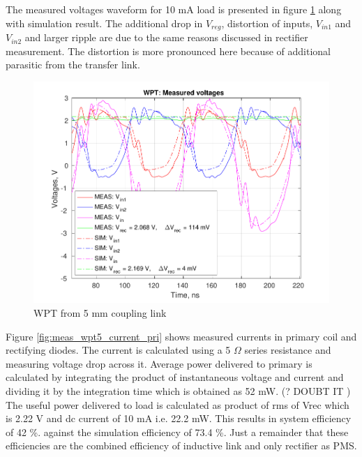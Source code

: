 \documentclass[UKenglish]{ifimaster}  %
\begin{document}
The measured voltages waveform for 10 mA load is presented in figure  \ref{fig:meas_wpt5_vs} along with simulation result.  The additional drop in $V_{reg}$, distortion of inputs, $V_{in1}$ and $V_{in2}$ and larger ripple are due to the same reasons discussed in  rectifier measurement. The distortion is more pronounced here because of additional parasitic from the transfer link. \\
\begin{figure} [!htbp]
  \centering
  \includegraphics[width=\textwidth]{img/meas/wpt5_vs.pdf} 
 \caption{WPT from 5 mm coupling link} 
\label{fig:meas_wpt5_vs} 
\end{figure}

Figure \ref{fig:meas_wpt5_current_pri}  shows measured currents in primary coil and rectifying diodes. The current is calculated using a 5 $\Omega$ series resistance and measuring voltage drop across it. Average power delivered to primary is calculated by integrating the product of instantaneous voltage and current and dividing it by the integration time which is obtained as 52 mW. (? DOUBT IT ) The useful power delivered  to load is calculated as product of rms of Vrec which is 2.22 V and dc current of 10 mA  i.e. 22.2 mW. This results in system efficiency of 42  \%. against the simulation efficiency of 73.4 \%. Just a remainder that these efficiencies are the combined efficiency of inductive link and only rectifier as PMS. \\
\end{document}
